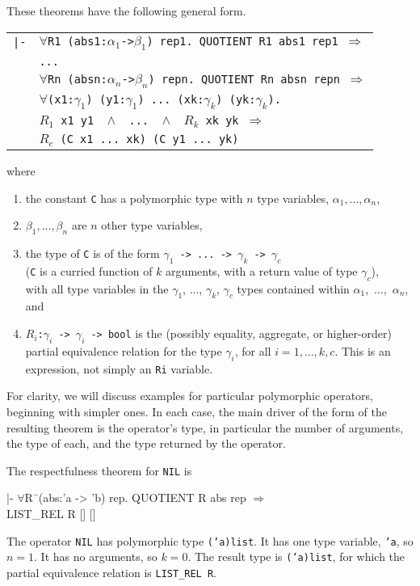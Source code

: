 \documentclass[envcountsame,runningheads]{llncs}
\newcommand{\quotient}{partial equivalence}
\begin{document}
These theorems have the following general form.
\begin{center}
\begin{tabular}{rl}
{\tt |-}
& {\tt $\forall$R1 (abs1:$\alpha_1$->$\beta_1$) rep1. QUOTIENT R1 abs1 rep1 $\Rightarrow$} \\
& {\tt ...} \\
& {\tt $\forall$Rn (absn:$\alpha_n$->$\beta_n$) repn. QUOTIENT Rn absn repn $\Rightarrow$} \\
& {\tt $\forall$(x1:$\gamma_1$) (y1:$\gamma_1$) ... (xk:$\gamma_k$) (yk:$\gamma_k$).}
\\
& \hspace{12mm}
{\tt $R_1$ x1 y1 \
$\wedge$ \ 
... \
$\wedge$ \ 
$R_k$ xk yk $\Rightarrow$
}  \\
& \hspace{12mm}
{\tt $R_c$ (C x1 ... xk) (C y1 ... yk)}  \\
\end{tabular}
\end{center}
where
\begin{enumerate}
\item
the constant {\tt C} has a polymorphic type with $n$ type variables,
$\alpha_1, ..., \alpha_n$,
\item
$\beta_1, ..., \beta_n$ are $n$ other type variables,
\item
the type of {\tt C} is of the form
{\tt $\gamma_1$ -> ... -> $\gamma_k$ -> $\gamma_c$} \\
({\tt C} is a curried function of $k$ arguments, with a return value of
type $\gamma_c$), \\
with
all type variables in the $\gamma_1$, ..., $\gamma_k$, $\gamma_c$ types
contained within $\alpha_1$,~...,~$\alpha_n$,
and
\item
{\tt $R_i$:$\gamma_i$ -> $\gamma_i$ -> bool}
is the (possibly equality, aggregate, or higher-order)
\quotient{} relation
for the type $\gamma_i$, for all $i=1,...,k,c$.
This is an expression, not simply an
{\tt Ri} variable.
\end{enumerate}

For clarity, we will discuss examples for particular polymorphic
operators, beginning with simpler ones.  In each case, the main driver
of the form of the resulting theorem is the operator's type, 
in particular the number of arguments, the type of each, and the type
returned by the operator.

\pagebreak[3]
The respectfulness theorem for {\tt NIL} is
{\tt \begin{tabbing}
\hspace{5.5mm}
    |- $\forall$R\=\ (abs:'a -> 'b) rep. QUOTIENT R abs rep $\Rightarrow$ \\
\>       LIST\_REL R [] []
\end{tabbing}}
The operator {\tt NIL} has polymorphic type {\tt ('a)list}. 
It has one type variable, {\tt 'a}, so $n = 1$. 
It has no arguments, so $k = 0$.
The result type is
{\tt ('a)list},
for which
the \quotient{} relation
is {\tt LIST\_REL R}.
\end{document}
